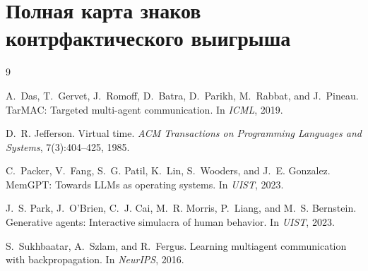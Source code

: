 \documentclass{article}
\begin{document}
\section{Полная карта знаков контрфактического выигрыша}
\label{app:signmap}

\begin{thebibliography}{9}

A.~Das, T.~Gervet, J.~Romoff, D.~Batra, D.~Parikh, M.~Rabbat, and
J.~Pineau.
\newblock TarMAC: Targeted multi-agent communication.
\newblock In \emph{ICML}, 2019.

D.~R. Jefferson.
\newblock Virtual time.
\newblock \emph{ACM Transactions on Programming Languages and Systems},
7(3):404--425, 1985.

C.~Packer, V.~Fang, S.~G. Patil, K.~Lin, S.~Wooders, and J.~E.
Gonzalez.
\newblock MemGPT: Towards LLMs as operating systems.
\newblock In \emph{UIST}, 2023.

J.~S. Park, J.~O'Brien, C.~J. Cai, M.~R. Morris, P.~Liang, and M.~S.
Bernstein.
\newblock Generative agents: Interactive simulacra of human behavior.
\newblock In \emph{UIST}, 2023.

S.~Sukhbaatar, A.~Szlam, and R.~Fergus.
\newblock Learning multiagent communication with backpropagation.
\newblock In \emph{NeurIPS}, 2016.

\end{thebibliography}
\end{document}
